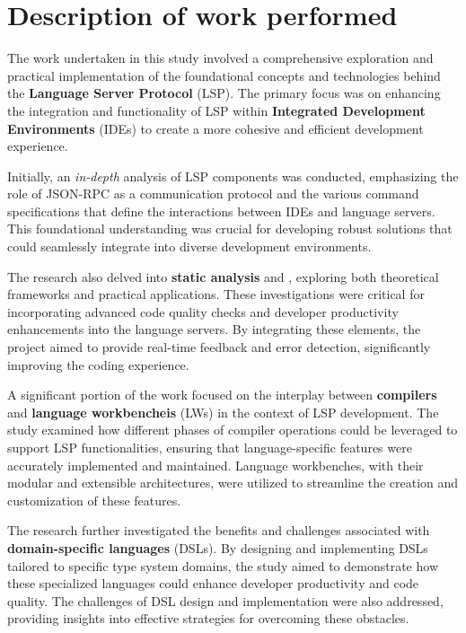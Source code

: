 \documentclass{adapt-lab}
\begin{document}
\section{Description of work performed}

The work undertaken in this study involved a comprehensive exploration and practical implementation of the foundational concepts and technologies behind the \textbf{Language Server Protocol} (LSP). The primary focus was on enhancing the integration and functionality of LSP within \textbf{Integrated Development Environments} (IDEs) to create a more cohesive and efficient development experience.

Initially, an \textit{in-depth} analysis of LSP components was conducted, emphasizing the role of JSON-RPC as a communication protocol and the various command specifications that define the interactions between IDEs and language servers. This foundational understanding was crucial for developing robust solutions that could seamlessly integrate into diverse development environments.

The research also delved into \textbf{static analysis} and , exploring both theoretical frameworks and practical applications. These investigations were critical for incorporating advanced code quality checks and developer productivity enhancements into the language servers. By integrating these elements, the project aimed to provide real-time feedback and error detection, significantly improving the coding experience.

A significant portion of the work focused on the interplay between \textbf{compilers} and \textbf{language workbencheis} (LWs) in the context of LSP development. The study examined how different phases of compiler operations could be leveraged to support LSP functionalities, ensuring that language-specific features were accurately implemented and maintained. Language workbenches, with their modular and extensible architectures, were utilized to streamline the creation and customization of these features.

The research further investigated the benefits and challenges associated with \textbf{domain-specific languages} (DSLs). By designing and implementing DSLs tailored to specific type system domains, the study aimed to demonstrate how these specialized languages could enhance developer productivity and code quality. The challenges of DSL design and implementation were also addressed, providing insights into effective strategies for overcoming these obstacles.
\end{document}
